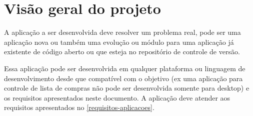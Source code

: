 \section{Visão geral do projeto}

A aplicação a ser desenvolvida deve resolver um problema real, pode ser uma aplicação nova ou também uma evolução ou módulo para uma aplicação já existente de código aberto ou que esteja no repositório de controle de versão.

Essa aplicação pode ser desenvolvida em qualquer plataforma ou linguagem de desenvolvimento desde que compatível com o objetivo (ex uma aplicação para controle de lista de compras não pode ser desenvolvida somente para desktop) e os requisitos apresentados neste documento. A aplicação deve atender aos requisitos apresentados no \autoref{requisitos-aplicacoes}.



